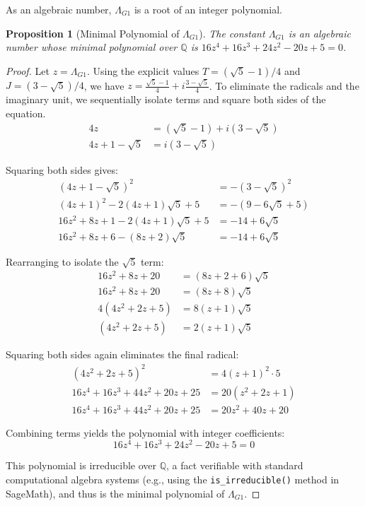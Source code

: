\documentclass{amsart}
\theoremstyle{plain}
\newtheorem{proposition}[theorem]{Proposition}
\theoremstyle{definition}
\theoremstyle{remark}
\newcommand{\LambdaG}{\Lambda_{G1}}
\begin{document}
As an algebraic number, $\LambdaG$ is a root of an integer polynomial.
\begin{proposition}[Minimal Polynomial of \texorpdfstring{$\LambdaG$}{Lambda\_G1}]
The constant $\LambdaG$ is an algebraic number whose minimal polynomial over $\mathbb{Q}$ is $16z^4 + 16z^3 + 24z^2 - 20z + 5 = 0$.
\end{proposition}
\begin{proof}
Let $z = \LambdaG$. Using the explicit values $T = (\sqrt{5}-1)/4$ and $J = (3-\sqrt{5})/4$, we have $z = \frac{\sqrt{5}-1}{4} + i\frac{3-\sqrt{5}}{4}$. To eliminate the radicals and the imaginary unit, we sequentially isolate terms and square both sides of the equation.
\begin{align*}
    4z &= (\sqrt{5}-1) + i(3-\sqrt{5}) \\
    4z + 1 - \sqrt{5} &= i(3-\sqrt{5})
\end{align*}

Squaring both sides gives:
\begin{align*}
    (4z+1 - \sqrt{5})^2 &= -(3-\sqrt{5})^2 \\
    (4z+1)^2 - 2(4z+1)\sqrt{5} + 5 &= -(9 - 6\sqrt{5} + 5) \\
    16z^2 + 8z + 1 - 2(4z+1)\sqrt{5} + 5 &= -14 + 6\sqrt{5} \\
    16z^2 + 8z + 6 - (8z+2)\sqrt{5} &= -14 + 6\sqrt{5}
\end{align*}

Rearranging to isolate the $\sqrt{5}$ term:
\begin{align*}
    16z^2 + 8z + 20 &= (8z+2+6)\sqrt{5} \\
    16z^2 + 8z + 20 &= (8z+8)\sqrt{5} \\
    4(4z^2 + 2z + 5) &= 8(z+1)\sqrt{5} \\
    (4z^2 + 2z + 5) &= 2(z+1)\sqrt{5}
\end{align*}

Squaring both sides again eliminates the final radical:
\begin{align*}
    (4z^2 + 2z + 5)^2 &= 4(z+1)^2 \cdot 5 \\
    16z^4 + 16z^3 + 44z^2 + 20z + 25 &= 20(z^2 + 2z + 1) \\
    16z^4 + 16z^3 + 44z^2 + 20z + 25 &= 20z^2 + 40z + 20
\end{align*}

Combining terms yields the polynomial with integer coefficients:
\[ 16z^4 + 16z^3 + 24z^2 - 20z + 5 = 0 \]

This polynomial is irreducible over $\mathbb{Q}$, a fact verifiable with standard computational algebra systems (e.g., using the \texttt{is\_irreducible()} method in SageMath), and thus is the minimal polynomial of $\LambdaG$.
\end{proof}
\end{document}
